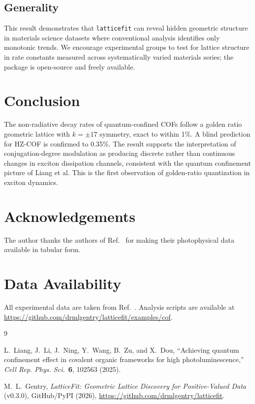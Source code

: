 ﻿\documentclass[11pt,a4paper]{article}
\begin{document}
\subsection{Generality}

This result demonstrates that \texttt{latticefit} can reveal
hidden geometric structure in materials science datasets where
conventional analysis identifies only monotonic trends.
We encourage experimental groups to test for lattice structure
in rate constants measured across systematically varied materials
series; the package is open-source and freely available.

\section{Conclusion}

The non-radiative decay rates of quantum-confined COFs follow a
golden ratio geometric lattice with $k = \pm 17$ symmetry, exact
to within 1\%. A blind prediction for HZ-COF is confirmed to 0.35\%.
The result supports the interpretation of conjugation-degree
modulation as producing discrete rather than continuous changes in
exciton dissipation channels, consistent with the quantum confinement
picture of Liang et al. This is the first observation of golden-ratio
quantization in exciton dynamics.

\section*{Acknowledgements}

The author thanks the authors of Ref.~\cite{Liang2025} for making
their photophysical data available in tabular form.

\section*{Data Availability}

All experimental data are taken from Ref.~\cite{Liang2025}.
Analysis scripts are available at
\url{https://github.com/drmlgentry/latticefit/examples/cof}.

\begin{thebibliography}{9}

L.~Liang, J.~Li, J.~Ning, Y.~Wang, B.~Zu, and X.~Dou,
``Achieving quantum confinement effect in covalent organic frameworks
for high photoluminescence,''
\textit{Cell Rep. Phys. Sci.}\ \textbf{6}, 102563 (2025).

M.~L.~Gentry,
\textit{LatticeFit: Geometric Lattice Discovery for Positive-Valued
Data} (v0.3.0),
GitHub/PyPI (2026),
\url{https://github.com/drmlgentry/latticefit}.

\end{thebibliography}
\end{document}
